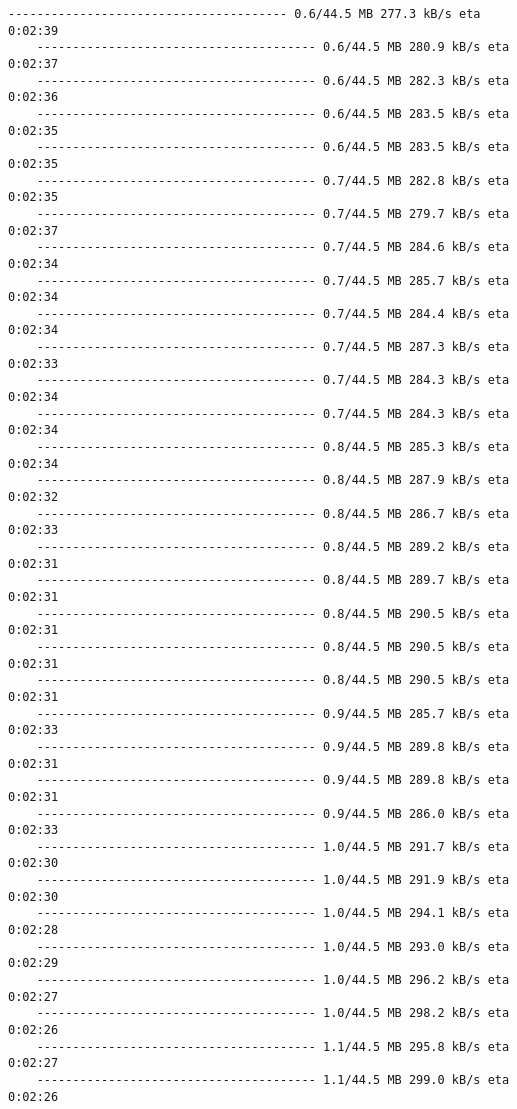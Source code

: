 \documentclass[11pt]{article}
\begin{document}
\begin{Verbatim}[commandchars=\\\{\}]
    --------------------------------------- 0.6/44.5 MB 277.3 kB/s eta 0:02:39
    --------------------------------------- 0.6/44.5 MB 280.9 kB/s eta 0:02:37
    --------------------------------------- 0.6/44.5 MB 282.3 kB/s eta 0:02:36
    --------------------------------------- 0.6/44.5 MB 283.5 kB/s eta 0:02:35
    --------------------------------------- 0.6/44.5 MB 283.5 kB/s eta 0:02:35
    --------------------------------------- 0.7/44.5 MB 282.8 kB/s eta 0:02:35
    --------------------------------------- 0.7/44.5 MB 279.7 kB/s eta 0:02:37
    --------------------------------------- 0.7/44.5 MB 284.6 kB/s eta 0:02:34
    --------------------------------------- 0.7/44.5 MB 285.7 kB/s eta 0:02:34
    --------------------------------------- 0.7/44.5 MB 284.4 kB/s eta 0:02:34
    --------------------------------------- 0.7/44.5 MB 287.3 kB/s eta 0:02:33
    --------------------------------------- 0.7/44.5 MB 284.3 kB/s eta 0:02:34
    --------------------------------------- 0.7/44.5 MB 284.3 kB/s eta 0:02:34
    --------------------------------------- 0.8/44.5 MB 285.3 kB/s eta 0:02:34
    --------------------------------------- 0.8/44.5 MB 287.9 kB/s eta 0:02:32
    --------------------------------------- 0.8/44.5 MB 286.7 kB/s eta 0:02:33
    --------------------------------------- 0.8/44.5 MB 289.2 kB/s eta 0:02:31
    --------------------------------------- 0.8/44.5 MB 289.7 kB/s eta 0:02:31
    --------------------------------------- 0.8/44.5 MB 290.5 kB/s eta 0:02:31
    --------------------------------------- 0.8/44.5 MB 290.5 kB/s eta 0:02:31
    --------------------------------------- 0.8/44.5 MB 290.5 kB/s eta 0:02:31
    --------------------------------------- 0.9/44.5 MB 285.7 kB/s eta 0:02:33
    --------------------------------------- 0.9/44.5 MB 289.8 kB/s eta 0:02:31
    --------------------------------------- 0.9/44.5 MB 289.8 kB/s eta 0:02:31
    --------------------------------------- 0.9/44.5 MB 286.0 kB/s eta 0:02:33
    --------------------------------------- 1.0/44.5 MB 291.7 kB/s eta 0:02:30
    --------------------------------------- 1.0/44.5 MB 291.9 kB/s eta 0:02:30
    --------------------------------------- 1.0/44.5 MB 294.1 kB/s eta 0:02:28
    --------------------------------------- 1.0/44.5 MB 293.0 kB/s eta 0:02:29
    --------------------------------------- 1.0/44.5 MB 296.2 kB/s eta 0:02:27
    --------------------------------------- 1.0/44.5 MB 298.2 kB/s eta 0:02:26
    --------------------------------------- 1.1/44.5 MB 295.8 kB/s eta 0:02:27
    --------------------------------------- 1.1/44.5 MB 299.0 kB/s eta 0:02:26

\end{Verbatim}
\end{document}
